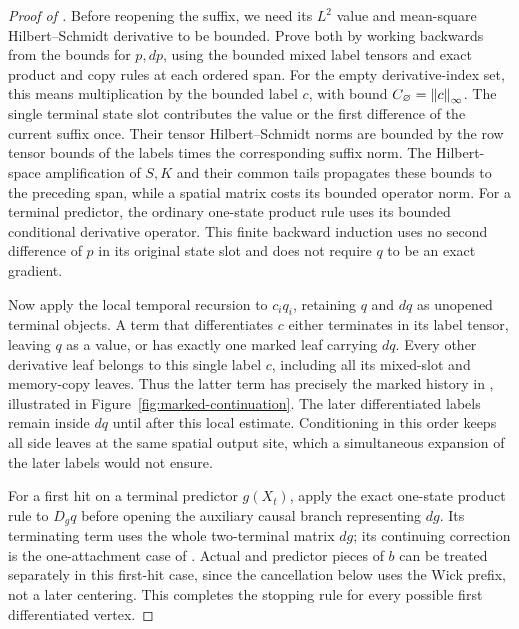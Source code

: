 \begin{proof}[Proof of ]
Before reopening the suffix, we need its $L^2$ value and mean-square
Hilbert--Schmidt derivative to be bounded. Prove both by working
backwards from the bounds for $p,dp$, using the bounded mixed label
tensors and exact product and copy rules at each ordered span. For the empty
derivative-index set, this means multiplication by the bounded label
$c$, with bound $C_{\varnothing}=\left\lVert c\right\rVert_\infty$. The single
terminal state slot contributes the value or the first difference of
the current suffix once. Their tensor Hilbert--Schmidt norms are
bounded by the row tensor bounds of the labels times the corresponding
suffix norm. The Hilbert-space amplification of $S,K$ and their
common tails propagates these bounds to the preceding span, while a
spatial matrix costs its bounded operator norm. For a terminal
predictor, the ordinary one-state product rule uses its bounded
conditional derivative operator. This finite backward induction uses no second difference of $p$ in
its original state slot and does not require $q$ to be an exact
gradient.

Now apply the local temporal recursion to $c_iq_i$, retaining $q$
and $dq$ as unopened terminal objects. A term that differentiates $c$ either terminates in
its label tensor, leaving $q$ as a value, or has exactly one marked
leaf carrying $dq$. Every other derivative leaf belongs to this
single label $c$, including all its mixed-slot and memory-copy
leaves. Thus the latter term has precisely the marked history in
, illustrated in
Figure~\ref{fig:marked-continuation}. The later differentiated labels remain inside $dq$ until after this
local estimate. Conditioning in this order keeps all side leaves at
the same spatial output site, which a simultaneous expansion of the
later labels would not ensure.

For a first hit on a terminal predictor $g(X_t)$, apply the exact
one-state product rule to $D_gq$ before opening the auxiliary causal
branch representing $dg$. Its terminating term uses the whole
two-terminal matrix $dg$; its continuing correction is the
one-attachment case of . Actual and
predictor pieces of $b$ can be treated separately in this first-hit
case, since the cancellation below uses the Wick prefix, not a
later centering. This completes the stopping rule for every possible
first differentiated vertex.


\end{proof}
